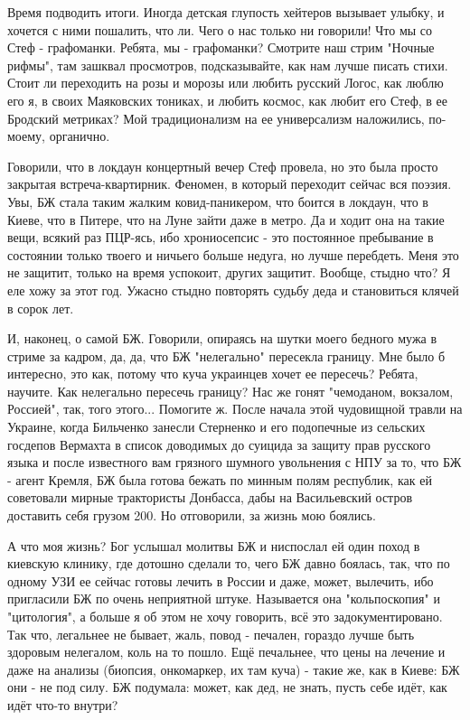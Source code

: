 Время подводить итоги. Иногда детская глупость хейтеров вызывает улыбку, и
хочется с ними пошалить, что ли. Чего о нас только ни говорили! Что мы со Стеф
- графоманки. Ребята, мы - графоманки? Смотрите наш стрим "Ночные рифмы", там
зашквал просмотров, подсказывайте, как нам лучше писать стихи. Стоит ли
переходить на розы и морозы или любить русский Логос, как люблю его я, в своих
Маяковских тониках, и любить космос, как любит его Стеф, в ее Бродский
метриках? Мой традиционализм на ее универсализм наложились, по-моему,
органично.

Говорили, что в локдаун концертный вечер Стеф провела, но это была просто
закрытая встреча-квартирник. Феномен, в который переходит сейчас вся поэзия.
Увы, БЖ стала таким жалким ковид-паникером, что боится в локдаун, что в Киеве,
что в Питере, что на Луне зайти даже в метро. Да и ходит она на такие вещи,
всякий раз ПЦР-ясь, ибо хрониосепсис - это постоянное пребывание в состоянии
только твоего и ничьего больше недуга, но лучше перебдеть. Меня это не защитит,
только на время успокоит, других защитит. Вообще, стыдно что? Я еле хожу за
этот год. Ужасно стыдно повторять судьбу деда и становиться клячей в сорок лет.

И, наконец, о самой БЖ. Говорили, опираясь на шутки моего бедного мужа в стриме
за кадром, да, да, что БЖ "нелегально" пересекла границу. Мне было б интересно,
это как, потому что куча украинцев хочет ее пересечь? Ребята, научите. Как
нелегально пересечь границу? Нас же гонят "чемоданом, вокзалом, Россией", так,
того этого... Помогите ж.  После начала этой чудовищной  травли на Украине,
когда Бильченко занесли Стерненко и его подопечные из сельских госдепов
Вермахта в список доводимых до суицида за защиту прав русского языка и после
известного вам грязного шумного увольнения с НПУ за то, что БЖ - агент Кремля,
БЖ была готова бежать по минным полям республик, как ей советовали мирные
трактористы Донбасса, дабы на Васильевский остров доставить себя грузом 200. Но
отговорили, за жизнь мою боялись.

А что моя жизнь? Бог услышал молитвы БЖ и ниспослал ей один поход в киевскую
клинику, где дотошно сделали то, чего БЖ давно боялась, так, что по одному УЗИ
ее сейчас готовы лечить в России и даже, может, вылечить, ибо пригласили БЖ по
очень неприятной штуке. Называется она "кольпоскопия" и "цитология", а больше я
об этом не хочу говорить, всё это задокументировано. Так что, легальнее не
бывает, жаль, повод - печален, гораздо лучше быть здоровым нелегалом, коль на
то пошло. Ещё печальнее, что цены на лечение и даже на анализы (биопсия,
онкомаркер, их там куча) - такие же, как в Киеве: БЖ они - не под силу. БЖ
подумала: может, как дед, не знать, пусть себе идёт, как идёт что-то внутри?

